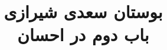 \documentclass[14pt,b5paper]{article}
\begin{document}
\title{\Huge بوستان سعدی شیرازی \\
باب دوم در احسان}
\author{ }
\date{ }
\maketitle
\newpage
\tableofcontents
\newpage

\newpage

\newpage

\newpage

\newpage

\newpage

\newpage

\newpage

\newpage

\newpage

\newpage

\newpage

\newpage

\newpage

\newpage

\newpage

\newpage

\newpage

\newpage

\newpage

\newpage

\newpage

\newpage

\newpage

\newpage

\newpage

\newpage

\newpage

\newpage

\newpage

\newpage
\end{document}
